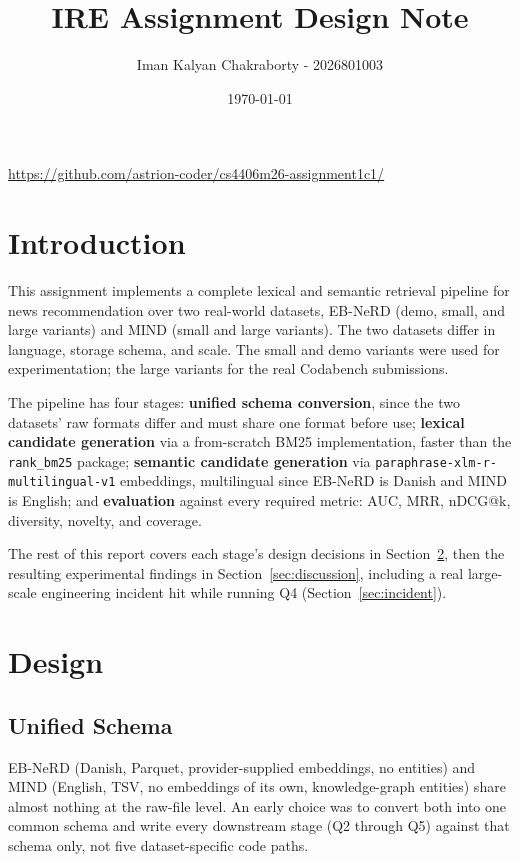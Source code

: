 \documentclass[11pt]{article}
\title{IRE Assignment Design Note}
\author{Iman Kalyan Chakraborty - 2026801003}
\date{\today}
\newcommand{\code}[1]{%
    \colorbox{gray!40}{\texttt{#1}}%
}
\begin{document}
\maketitle
\begin{center}
\url{https://github.com/astrion-coder/cs4406m26-assignment1c1/}
\end{center}

\section{Introduction}

This assignment implements a complete lexical and semantic retrieval pipeline for news
recommendation over two real-world datasets, EB-NeRD (demo, small, and large variants) and MIND
(small and large variants). The two datasets differ in language, storage schema, and scale. The
small and demo variants were used for experimentation; the large variants for the real Codabench
submissions.

\begin{sloppypar}
The pipeline has four stages: \textbf{unified schema conversion}, since the two datasets' raw
formats differ and must share one format before use; \textbf{lexical candidate generation} via a
from-scratch BM25 implementation, faster than the \code{rank\_bm25} package; \textbf{semantic
candidate generation} via \code{paraphrase-xlm-r-multilingual-v1} embeddings, multilingual since
EB-NeRD is Danish and MIND is English; and \textbf{evaluation} against every required metric:
AUC, MRR, nDCG@k, diversity, novelty, and coverage.
\end{sloppypar}

The rest of this report covers each stage's design decisions in Section~\ref{sec:design}, then
the resulting experimental findings in Section~\ref{sec:discussion}, including a real
large-scale engineering incident hit while running Q4 (Section~\ref{sec:incident}).

\section{Design}
\label{sec:design}

\subsection{Unified Schema}

EB-NeRD (Danish, Parquet, provider-supplied embeddings, no entities) and MIND (English, TSV, no
embeddings of its own, knowledge-graph entities) share almost nothing at the raw-file level. An
early choice was to convert both into one common schema and write every downstream stage (Q2
through Q5) against that schema only, not five dataset-specific code paths.
\end{document}
